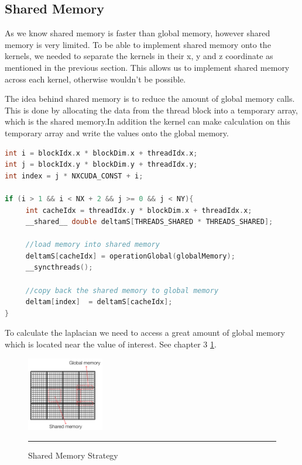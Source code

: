 \subsection{Shared Memory}

As we know shared memory is faster than global memory, however shared memory is very limited. To be able to implement shared memory onto the kernels, we needed to separate the kernels in their x, y and z coordinate as mentioned in the previous section. This allows us to implement shared memory across each kernel, otherwise wouldn't be possible.

The idea behind shared memory is to reduce the amount of global memory calls. This is done by allocating the data from the thread block into a temporary array, which is the shared memory.In addition the kernel can make calculation on this temporary array and write the values onto the global memory.

\begin{lstlisting}[language=C++, label={lst:shared}, caption={Shared memory}]
int i = blockIdx.x * blockDim.x + threadIdx.x;
int j = blockIdx.y * blockDim.y + threadIdx.y;
int index = j * NXCUDA_CONST + i;

if (i > 1 && i < NX + 2 && j >= 0 && j < NY){
     int cacheIdx = threadIdx.y * blockDim.x + threadIdx.x;
     __shared__ double deltamS[THREADS_SHARED * THREADS_SHARED];

	 //load memory into shared memory
     deltamS[cacheIdx] = operationGlobal(globalMemory);
     __syncthreads();

	 //copy back the shared memory to global memory
     deltam[index]  = deltamS[cacheIdx];
}
\end{lstlisting}

To calculate the laplacian we need to access a great amount of global memory which is located near the value of interest. See chapter 3 \ref{fig:shared}.

\begin{figure}[htbp]
	\centering
		\includegraphics[width=0.3\textwidth]{Figures/shared.png}
		\rule{35em}{0.2pt}
	\caption[Shared Memory Strategy]{Shared Memory Strategy }
	\label{fig:shared}
\end{figure}


